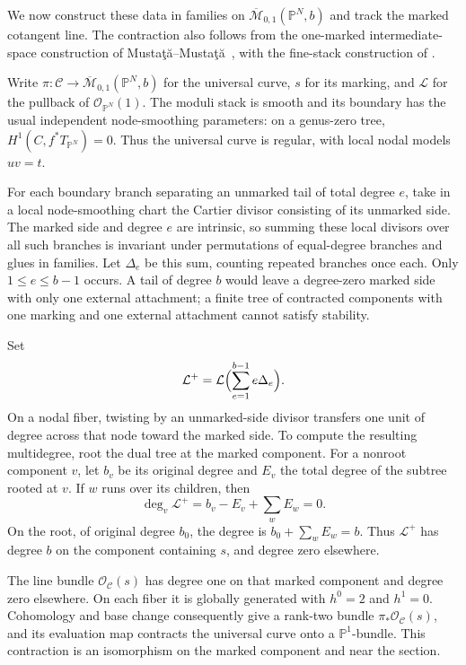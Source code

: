 We now construct these data in families on
\(\overline{\mathcal M}_{0,1}(\mathbb P^N,b)\) and track the marked
cotangent line.  The contraction also follows from the one-marked
intermediate-space construction of
Mustaţă--Mustaţă~\cite[Definition~1.2 and Proposition~1.3]
{MustataMustata2007}, with the fine-stack construction of
\cite[Proposition~1.7]{MustataMustataChow}.

Write \(\pi:\mathcal C\to\overline{\mathcal M}_{0,1}(\mathbb P^N,b)\)
for the universal curve, \(s\) for its marking, and
\(\mathcal L\) for the pullback of \(\mathcal O_{\mathbb P^N}(1)\).
The moduli stack is smooth and its boundary has the usual independent
node-smoothing parameters: on a genus-zero tree,
\(H^1(C,f^*T_{\mathbb P^N})=0\).  Thus the universal curve is regular,
with local nodal models \(uv=t\).

For each boundary branch separating an unmarked tail of total degree
\(e\), take in a local node-smoothing chart the Cartier divisor
consisting of its unmarked side.  The marked side and degree \(e\)
are intrinsic, so summing these local divisors over all such branches
is invariant under permutations of equal-degree branches and glues
in families.  Let \(\Delta_e\) be this sum, counting repeated branches
once each.
Only \(1\le e\le b-1\) occurs.  A tail of degree \(b\) would leave a
degree-zero marked side with only one external attachment; a finite
tree of contracted components with one marking and one external
attachment cannot satisfy stability.

Set
\[
  \mathcal L^+
    =\mathcal L\Bigl(\sum_{e=1}^{b-1}e\Delta_e\Bigr).
\]
On a nodal fiber, twisting by an unmarked-side divisor transfers one
unit of degree across that node toward the marked side.  To compute
the resulting multidegree, root the dual tree at the marked component.
For a nonroot component \(v\), let \(b_v\) be its original degree
and \(E_v\) the total degree of the subtree rooted at \(v\).
If \(w\) runs over its children, then
\[
  \deg_v\mathcal L^+=b_v-E_v+\sum_w E_w=0.
\]
On the root, of original degree \(b_0\), the degree is
\(b_0+\sum_wE_w=b\).  Thus \(\mathcal L^+\) has degree \(b\)
on the component containing \(s\), and degree zero elsewhere.

The line bundle \(\mathcal O_{\mathcal C}(s)\) has degree one on that
marked component and degree zero elsewhere.  On each fiber it is
globally generated with \(h^0=2\) and \(h^1=0\).  Cohomology and base
change consequently give a rank-two bundle
\(\pi_*\mathcal O_{\mathcal C}(s)\), and its evaluation map contracts
the universal curve onto a \(\mathbb P^1\)-bundle.  This contraction
is an isomorphism on the marked component and near the section.


